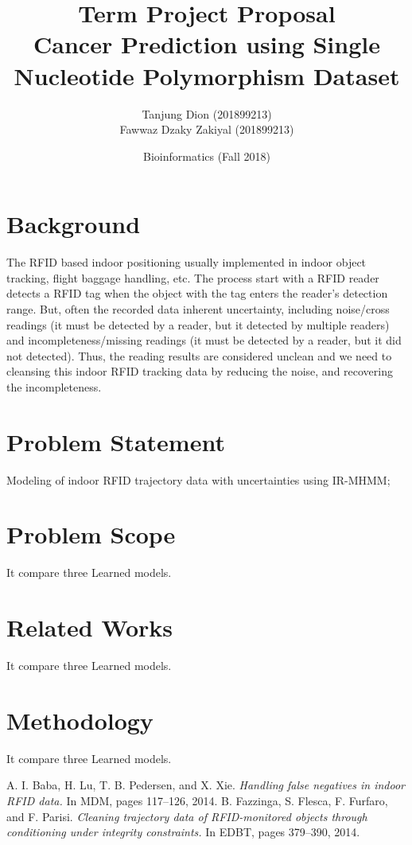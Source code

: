 \documentclass[a4paper,oneside]{article}
\begin{document}
\title{\vspace{-0.7in}Term Project Proposal\\
Cancer Prediction using Single Nucleotide Polymorphism Dataset}
\author{Tanjung Dion (201899213)\\Fawwaz Dzaky Zakiyal (201899213)\\}
\date{Bioinformatics (Fall 2018)}
\maketitle
 
\section{Background}
The RFID based indoor positioning usually implemented in indoor object tracking, flight baggage handling, etc. The process start with a RFID reader detects a RFID tag when the object with the tag enters the reader’s detection range. But, often the recorded data inherent uncertainty, including noise/cross readings (it must be detected by a reader, but it detected by multiple readers) and incompleteness/missing readings (it must be detected by a reader, but it did not detected). Thus, the reading results are considered unclean and we need to cleansing this indoor RFID tracking data by reducing the noise, and recovering the incompleteness.

\section{Problem Statement}
Modeling of indoor RFID trajectory data with uncertainties using IR-MHMM;

\section{Problem Scope}
It compare three Learned models.

\section{Related Works}
It compare three Learned models.

\section{Methodology}
It compare three Learned models.

\begin{thebibliography}{1}
\bibitem{} A. I. Baba, H. Lu, T. B. Pedersen, and X. Xie. {\em Handling false
negatives in indoor RFID data.} In MDM, pages 117–126, 2014.
\bibitem{} B. Fazzinga, S. Flesca, F. Furfaro, and F. Parisi. {\em Cleaning trajectory data of RFID-monitored objects through conditioning under integrity constraints.} In EDBT, pages
379–390, 2014.
\end{thebibliography}
\end{document}
